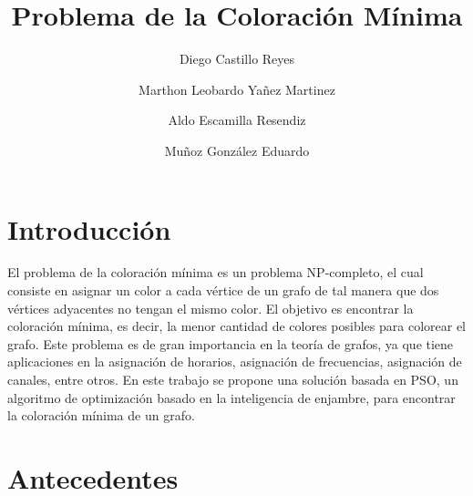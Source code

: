 \documentclass[9pt,a4paper,twoside]{tau-class/tau}
\title{Problema de la Coloración Mínima}%
\author[a]{Diego Castillo Reyes}
\author[a]{Marthon Leobardo Yañez Martinez}
\author[a]{Aldo Escamilla Resendiz}
\author[a]{Muñoz González Eduardo}
\affil[a]{Investigadores en formación, ESCOM, IPN}
\begin{document}
	
    \maketitle 
    \thispagestyle{firststyle} 
    \tauabstract

\section{Introducción}

    El problema de la coloración mínima es un problema NP-completo, el cual consiste en asignar un color a cada vértice de un grafo de tal manera que dos vértices adyacentes no tengan el mismo color.
    El objetivo es encontrar la coloración mínima, es decir, la menor cantidad de colores posibles para colorear el grafo.
    Este problema es de gran importancia en la teoría de grafos, ya que tiene aplicaciones en la asignación de horarios, asignación de frecuencias, asignación de canales, entre otros.
    En este trabajo se propone una solución basada en PSO, un algoritmo de optimización basado en la inteligencia de enjambre, para encontrar la coloración mínima de un grafo.

\section{Antecedentes}
\end{document}
